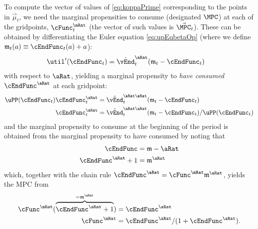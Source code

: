\documentclass[titlepage]{\econtex}
\begin{document}
To compute the vector of values of \eqref{eq:koppaPrime} corresponding
to the points in $\vec{\mu}_{t}$, we need the marginal propensities to
consume (designated $\MPC$) at each of the gridpoints,
$\cFunc^{\mRat}_{t}$ (the vector of such values is 
$\vec{\MPC}_{t}$).  These can be obtained by differentiating the
Euler equation \eqref{eq:upEqbetaOp} (where we define
$\mathfrak{m}_{t}({a}) \equiv \cEndFunc_{t}({a})+{a}$):
\begin{equation}\begin{gathered}\begin{aligned}
  \util^{\prime}({\cEndFunc}_{t})   & = \hat{\vEnd}_{t}^{\aRat}(\mathfrak{m}_{t}-{\cEndFunc}_{t})
\end{aligned}\end{gathered}\end{equation}
with respect to $\aRat$, yielding a marginal propensity to
\textit{have consumed} $\cEndFunc^{\aRat}$ at each gridpoint:
\begin{equation}\begin{gathered}\begin{aligned}
  \uPP(\cEndFunc_{t})\cEndFunc_{t}^{\aRat}  & = \hat{\vEnd}_{t}^{\aRat\aRat}(\mathfrak{m}_{t}-{\cEndFunc}_{t})
  \\ \cEndFunc_{t}^{\aRat}  & = \hat{\vEnd}_{t}^{\aRat\aRat}(\mathfrak{m}_{t}-{\cEndFunc}_{t})/\uPP(\cEndFunc_{t})
\end{aligned}\end{gathered}\end{equation}
and the marginal propensity to consume at the beginning of the period is obtained from the marginal
propensity to have consumed by noting that
\begin{equation*}\begin{gathered}\begin{aligned}
  \cEndFunc  & = \mathfrak{m}-\aRat
  \\ \cEndFunc^{\aRat}+1  & = \mathfrak{m}^{\aRat}
\end{aligned}\end{gathered}\end{equation*}
which, together with the chain rule $\cEndFunc^{\aRat}  = \cFunc^{\mRat}\mathfrak{m}^{\aRat}$,
yields the MPC from
\begin{equation}\begin{gathered}\begin{aligned}
  \cFunc^{\mRat}(\overbrace{\cEndFunc^{\aRat}+1}^{=\mathfrak{m}^{\aRat}})  & = \cEndFunc^{\aRat}
  \\ \cFunc^{\mRat}  & = \cEndFunc^{\aRat}/(1+\cEndFunc^{\aRat}) \label{eq:MPCfromMPTHC}.
\end{aligned}\end{gathered}\end{equation}
\end{document}
